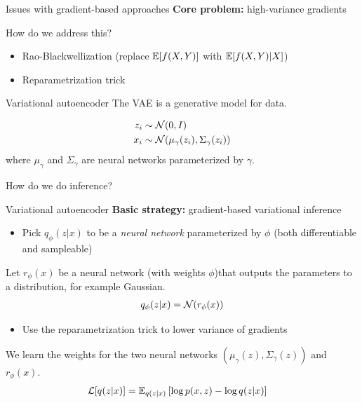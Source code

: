 \documentclass[10pt, compress]{beamer}
\begin{document}
\begin{frame}{Issues with gradient-based approaches}
  \textbf{Core problem:}  high-variance gradients

  \pause

  How do we address this?

  \begin{itemize}
    \item Rao-Blackwellization (replace $\mathbb{E}[f(X, Y)]$ with $\mathbb{E}[f(X, Y) | X]$)\cite{blackbox}
    \item Reparametrization trick \cite{vae}
  \end{itemize}
\end{frame}

\begin{frame}{Variational autoencoder}
  The VAE is a generative model for data.

  \begin{align*}
    z_i &\sim  \mathcal{N}(0, I) \\
    x_i &\sim  \mathcal{N}(\mu_\gamma(z_i), \Sigma_\gamma(z_i))
  \end{align*}
  where $\mu_\gamma$ and $\Sigma_\gamma$ are neural networks parameterized by $\gamma$.

  \pause
  \centering
  
  \pause
   
  How do we do inference?
\end{frame}

\begin{frame}{Variational autoencoder}
  \textbf{Basic strategy:} gradient-based variational inference

  \pause

  \begin{itemize}
    \item Pick $q_\phi(z | x)$ to be a \emph{neural network} parameterized by $\phi$ (both differentiable and sampleable)
  \end{itemize}

  \pause
  Let $r_\phi(x)$ be a neural network (with weights $\phi$)that outputs the parameters to a distribution, for example Gaussian.
  \begin{align*}
    q_\phi(z | x) = \mathcal{N}(r_\phi(x))
  \end{align*}

  \pause

  \begin{itemize}
    \item Use the reparametrization trick to lower variance of gradients
  \end{itemize}
  \pause
  We learn the weights for the two neural networks $(\mu_\gamma(z), \Sigma_\gamma(z))$ and $r_\phi(x)$.
  \pause
  \begin{align*}
    \mathcal{L}[q(z | x)] &= \mathbb{E}_{q(z | x)}\left[\log p(x, z) - \log q(z | x)\right]
  \end{align*}
\end{frame}
\end{document}
